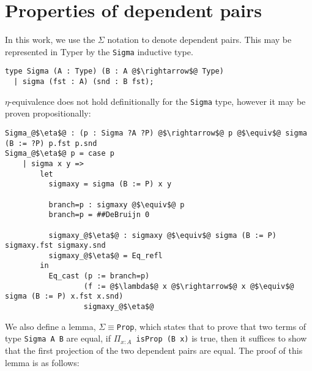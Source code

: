 \documentclass[12pt,twoside,maitrise]{dms}
\theoremstyle{definition}
\numberwithin{equation}{section}
\numberwithin{table}{chapter}
\numberwithin{figure}{chapter}
\newcommand\id[1] {\texttt{#1}}
\newcommand\fn[1] {\texttt{#1}}
\begin{document}
\section{Properties of dependent pairs}\label{app:deppairs-properties}
In this work, we use the $\Sigma$ notation to denote dependent pairs. This may
be represented in Typer by the \id{Sigma} inductive type.


\begin{verbatim}
type Sigma (A : Type) (B : A @$\rightarrow$@ Type)
  | sigma (fst : A) (snd : B fst);
\end{verbatim}

$\eta$-equivalence does not hold definitionally for the \id{Sigma} type, however
it may be proven propositionally:

\begin{verbatim}
Sigma_@$\eta$@ : (p : Sigma ?A ?P) @$\rightarrow$@ p @$\equiv$@ sigma (B := ?P) p.fst p.snd
Sigma_@$\eta$@ p = case p
    | sigma x y =>
        let
          sigmaxy = sigma (B := P) x y

          branch=p : sigmaxy @$\equiv$@ p
          branch=p = ##DeBruijn 0

          sigmaxy_@$\eta$@ : sigmaxy @$\equiv$@ sigma (B := P) sigmaxy.fst sigmaxy.snd
          sigmaxy_@$\eta$@ = Eq_refl
        in
          Eq_cast (p := branch=p)
                  (f := @$\lambda$@ x @$\rightarrow$@ x @$\equiv$@ sigma (B := P) x.fst x.snd)
                  sigmaxy_@$\eta$@
\end{verbatim}

We also define a lemma, \id{$\Sigma${}$\equiv${}Prop}, which states that to
prove that two terms of type \fn{Sigma A B} are equal, if \fn{$\Pi_{x \colon A}$ isProp
  (B x)} is true, then it suffices to show that the first projection of the two
dependent pairs are equal. The proof of this lemma is as follows:
\end{document}
